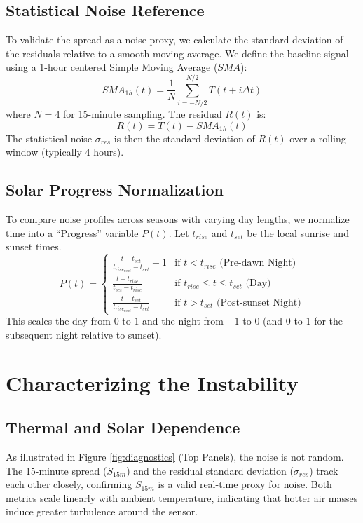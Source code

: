 \documentclass{article}
\begin{document}
\subsection{Statistical Noise Reference}
To validate the spread as a noise proxy, we calculate the standard deviation of the residuals relative to a smooth moving average. We define the baseline signal using a 1-hour centered Simple Moving Average ($SMA$):
\begin{equation}
    SMA_{1h}(t) = \frac{1}{N} \sum_{i=-N/2}^{N/2} T(t+i\Delta t)
\end{equation}
where $N=4$ for 15-minute sampling. The residual $R(t)$ is:
\begin{equation}
    R(t) = T(t) - SMA_{1h}(t)
\end{equation}
The statistical noise $\sigma_{res}$ is then the standard deviation of $R(t)$ over a rolling window (typically 4 hours).

\subsection{Solar Progress Normalization}
To compare noise profiles across seasons with varying day lengths, we normalize time into a ``Progress'' variable $P(t)$. Let $t_{rise}$ and $t_{set}$ be the local sunrise and sunset times.
\begin{equation}
    P(t) = 
    \begin{cases} 
      \frac{t - t_{set}}{t_{rise_{next}} - t_{set}} - 1 & \text{if } t < t_{rise} \text{ (Pre-dawn Night)} \\
      \frac{t - t_{rise}}{t_{set} - t_{rise}} & \text{if } t_{rise} \le t \le t_{set} \text{ (Day)} \\
      \frac{t - t_{set}}{t_{rise_{next}} - t_{set}} & \text{if } t > t_{set} \text{ (Post-sunset Night)}
    \end{cases}
\end{equation}
This scales the day from $0$ to $1$ and the night from $-1$ to $0$ (and $0$ to $1$ for the subsequent night relative to sunset).

\section{Characterizing the Instability}

\subsection{Thermal and Solar Dependence}
As illustrated in Figure \ref{fig:diagnostics} (Top Panels), the noise is not random. The 15-minute spread ($S_{15m}$) and the residual standard deviation ($\sigma_{res}$) track each other closely, confirming $S_{15m}$ is a valid real-time proxy for noise. Both metrics scale linearly with ambient temperature, indicating that hotter air masses induce greater turbulence around the sensor.
\end{document}

